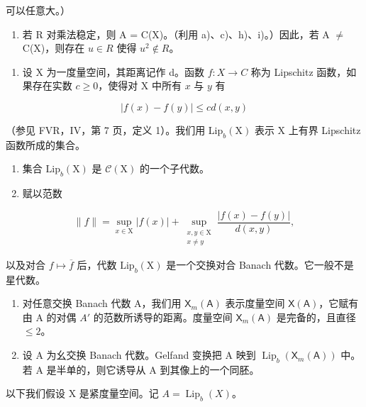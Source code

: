 可以任意大。）

\begin{enumerate}
\def\labelenumi{\alph{enumi})}
\setcounter{enumi}{9}
\tightlist
\item
  若 R 对乘法稳定，则 A = C(X)。（利用 a)、c)、h)、i)。）因此，若 A \(\neq\) C(X)，则存在 \(u \in R\) 使得 \(u^{2} \notin R\)。
\end{enumerate}

\begin{enumerate}
\def\labelenumi{\arabic{enumi})}
\setcounter{enumi}{10}
\tightlist
\item
  设 X 为一度量空间，其距离记作 d。函数 \(f: X \to C\) 称为 Lipschitz 函数，如果存在实数 \(c \geqslant 0\)，使得对 X 中所有 \(x\) 与 \(y\) 有
\end{enumerate}

\[
| f (x) - f (y) | \leqslant c d (x, y)
\]

（参见 FVR，IV，第 7 页，定义 1）。我们用 \(\mathrm{Lip}_b(\mathrm{X})\) 表示 X 上有界 Lipschitz 函数所成的集合。

\begin{enumerate}
\def\labelenumi{\alph{enumi})}
\item
  集合 \(\mathrm{Lip}_b(\mathrm{X})\) 是 \(\mathcal{C}(\mathrm{X})\) 的一个子代数。
\item
  赋以范数
\end{enumerate}

\[
\| f\| = \sup_{x\in \mathrm{X}}|f(x)| + \sup_{\substack{x,y\in \mathrm{X}\\ x\neq y}}\frac{|f(x) - f(y)|}{d(x,y)},
\]

以及对合 \(f \mapsto \overline{f}\) 后，代数 \(\mathrm{Lip}_b(\mathrm{X})\) 是一个交换对合 Banach 代数。它一般不是星代数。

\begin{enumerate}
\def\labelenumi{\alph{enumi})}
\setcounter{enumi}{2}
\item
  对任意交换 Banach 代数 A，我们用 \(\mathsf{X}_{m}(\mathsf{A})\) 表示度量空间 \(\mathsf{X}(\mathsf{A})\)，它赋有由 A 的对偶 \(A'\) 的范数所诱导的距离。度量空间 \(\mathsf{X}_{m}(\mathsf{A})\) 是完备的，且直径 \(\leqslant 2\)。
\item
  设 A 为幺交换 Banach 代数。Gelfand 变换把 A 映到 \(\operatorname{Lip}_{b}(\mathsf{X}_{m}(\mathsf{A}))\) 中。若 A 是半单的，则它诱导从 A 到其像上的一个同胚。
\end{enumerate}

以下我们假设 X 是紧度量空间。记 \(A = \operatorname{Lip}_{b}(X)\)。

